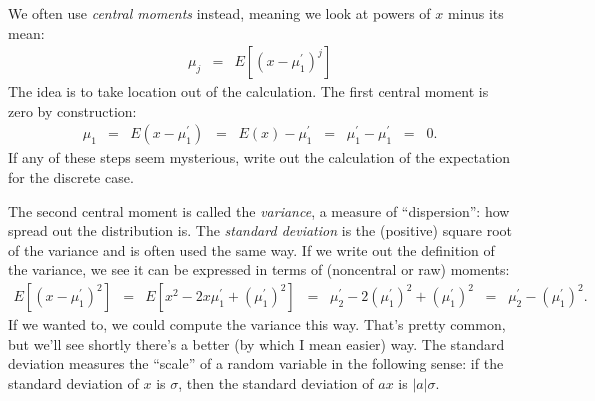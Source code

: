\documentclass[11pt]{article}
\begin{document}
We often use {\it central moments\/} instead, meaning we look at powers
of $x$ minus its mean:
\begin{eqnarray*}
    \mu_j &=& E [(x-\mu_1^\prime)^j]
\end{eqnarray*}
The idea is to take location out of the calculation.  
The first central moment is zero by construction:
\begin{eqnarray*}
    \mu_1 &=& E (x-\mu_1^\prime)
            \;\;=\;\;  E(x) - \mu_1^\prime
            \;\;=\;\;  \mu_1^\prime - \mu_1^\prime  \;\;=\;\; 0.
\end{eqnarray*}
If any of these steps seem mysterious, write out the calculation of the expectation
for the discrete case.

The second central moment is called the {\it variance\/},
a measure of ``dispersion'':  how spread out the distribution is.
The {\it standard deviation\/} is the (positive) square root of the variance
and is often used the same way.
If we write out the definition of the variance,
we see it can be expressed in terms of (noncentral or raw) moments:
\begin{eqnarray*}
    E [(x-\mu_1^\prime)^2]  &=&  E [x^2 - 2 x\mu_1^\prime + (\mu_1^\prime)^2]
            \;\;=\;\; \mu_2^\prime - 2 (\mu_1^\prime)^2 + (\mu_1^\prime)^2
            \;\;=\;\; \mu_2^\prime -  (\mu_1^\prime)^2 .
\end{eqnarray*}
If we wanted to, we could compute the variance this way.
That's pretty common, but we'll see shortly there's a
better (by which I mean easier) way.
The standard deviation measures the ``scale'' of a random variable
in the following sense:
if the standard deviation of $x$ is $\sigma$,
then the standard deviation of $ax$ is $| a | \sigma$.
\end{document}
